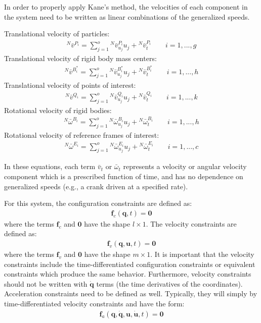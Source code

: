 \documentclass[smallcondensed,final]{svjour3}                     %
\begin{document}
In order to properly apply Kane's method, the velocities of each component in
the system need to be written as linear combinations of the generalized speeds.

Translational velocity of particles:
\begin{align}
\label{eq:particle_translational}
{^N}\bar{v}^{P_i} = \sum^o_{j=1} {^N}\bar{v}^{P_i}_{u_j} u_j + {^N}\bar{v}^{P_i}_t
\quad \quad i=1,...,g
\end{align}
Translational velocity of rigid body mass centers:
\begin{align}
\label{eq:rb_translational}
{^N}\bar{v}^{B_i^*} = \sum_{j=1}^o {^N}\bar{v}^{B_i^*}_{u_j} u_j +
{^N}\bar{v}^{B_i^*}_t \quad \quad i=1,...,h
\end{align}
Translational velocity of points of interest:
\begin{align}
\label{eq:points_translational}
{^N}\bar{v}^{Q_i} = \sum_{j=1}^o {^N}\bar{v}^{Q_i}_{u_j} u_j + {^N}\bar{v}^{Q_i}_t
\quad \quad i=1,...,k
\end{align}
Rotational velocity of rigid bodies:
\begin{align}
\label{eq:rb_rotational_bodies}
{^N}\bar{\omega}^{B_i} = \sum_{j=1}^o {^N}\bar{\omega}^{B_i}_{u_j} u_j +
{^N}\bar{\omega}^{B_i}_t \quad \quad i=1,...,h
\end{align}
Rotational velocity of reference frames of interest:
\begin{align}
\label{eq:rb_rotational_frames}
{^N}\bar{\omega}^{E_i} = \sum_{j=1}^o {^N}\bar{\omega}^{E_i}_{u_j} u_j +
{^N}\bar{\omega}^{E_i}_t \quad \quad i=1,...,c
\end{align}

In these equations, each term $\bar{v}_t$ or $\bar{\omega}_t$ represents a
velocity or angular velocity component which is a prescribed function of time,
and has no dependence on generalized speeds (e.g., a crank
driven at a specified rate).

For this system, the configuration constraints are defined as:
\begin{align}
\label{eq:configuration_constraints}
\mathbf{f}_c(\mathbf{q}, t) = \mathbf{0}
\end{align}
where the terms $\mathbf{f}_c$ and $\mathbf{0}$ have the shape $l \times 1$.
The velocity constraints are defined as:
\begin{align}
\label{eq:velocity_constraints}
\mathbf{f}_v(\mathbf{q}, \mathbf{u}, t) = \mathbf{0}
\end{align}
where the terms $\mathbf{f}_v$ and $\mathbf{0}$ have the shape $m \times 1$.
It is important that the velocity constraints include the time-differentiated
configuration constraints or equivalent constraints which produce the same
behavior.
Furthermore, velocity constraints should not be written with $\dot{\mathbf{q}}$
terms (the time derivatives of the coordinates).
Acceleration constraints need to be defined as well.
Typically, they will simply by time-differentiated velocity constraints and
have the form:
\begin{align}
\label{eq:acceleration_constraints}
\mathbf{f}_a(\mathbf{q}, \dot{\mathbf{q}}, \mathbf{u}, \dot{\mathbf{u}}, t) =
\mathbf{0}
\end{align}
\end{document}
